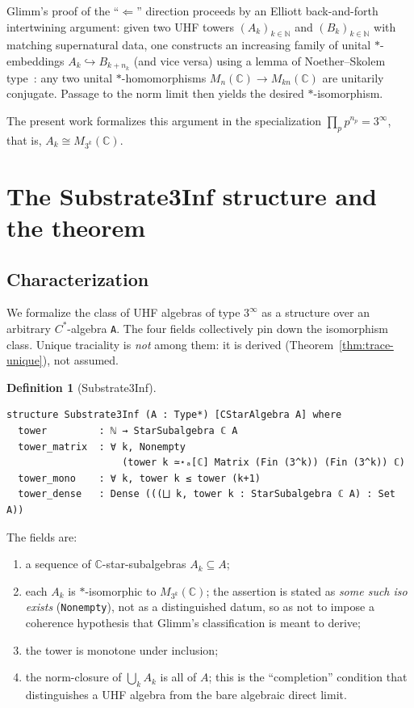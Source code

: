 \documentclass[11pt,a4paper]{article}
\theoremstyle{plain}
\theoremstyle{definition}
\newtheorem{definition}[theorem]{Definition}
\begin{document}
Glimm's proof of the ``$\Leftarrow$'' direction proceeds by an Elliott back-and-forth intertwining argument: given two UHF towers $(A_k)_{k \in \mathbb{N}}$ and $(B_k)_{k \in \mathbb{N}}$ with matching supernatural data, one constructs an increasing family of unital $\ast$-embeddings $A_k \hookrightarrow B_{k+n_k}$ (and vice versa) using a lemma of Noether--Skolem type~\cite{skolem1927, noether1929}: any two unital $\ast$-homomorphisms $M_n(\mathbb{C}) \to M_{kn}(\mathbb{C})$ are unitarily conjugate. Passage to the norm limit then yields the desired $\ast$-isomorphism.

The present work formalizes this argument in the specialization $\prod_p p^{n_p} = 3^{\infty}$, that is, $A_k \cong M_{3^k}(\mathbb{C})$.

\section{The Substrate3Inf structure and the theorem}
\label{sec:substrate}

\subsection{Characterization}

We formalize the class of UHF algebras of type $3^{\infty}$ as a structure over an arbitrary $C^{\ast}$-algebra \texttt{A}. The four fields collectively pin down the isomorphism class. Unique traciality is \emph{not} among them: it is derived (Theorem~\ref{thm:trace-unique}), not assumed.

\begin{definition}[Substrate3Inf]
\label{def:substrate3inf}
\begin{lstlisting}
structure Substrate3Inf (A : Type*) [CStarAlgebra A] where
  tower         : ℕ → StarSubalgebra ℂ A
  tower_matrix  : ∀ k, Nonempty
                    (tower k ≃⋆ₐ[ℂ] Matrix (Fin (3^k)) (Fin (3^k)) ℂ)
  tower_mono    : ∀ k, tower k ≤ tower (k+1)
  tower_dense   : Dense (((⨆ k, tower k : StarSubalgebra ℂ A) : Set A))
\end{lstlisting}
\end{definition}

\noindent
The fields are:
\begin{enumerate}[leftmargin=2em]
  \item[\texttt{tower}:] a sequence of $\mathbb{C}$-star-subalgebras $A_k \subseteq A$;
  \item[\texttt{tower\_matrix}:] each $A_k$ is $\ast$-isomorphic to $M_{3^k}(\mathbb{C})$; the assertion is stated as \emph{some such iso exists} (\texttt{Nonempty}), not as a distinguished datum, so as not to impose a coherence hypothesis that Glimm's classification is meant to derive;
  \item[\texttt{tower\_mono}:] the tower is monotone under inclusion;
  \item[\texttt{tower\_dense}:] the norm-closure of $\bigcup_k A_k$ is all of $A$; this is the ``completion'' condition that distinguishes a UHF algebra from the bare algebraic direct limit.
\end{enumerate}
\end{document}
